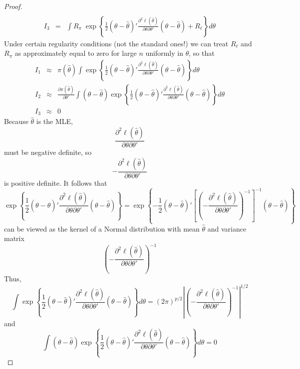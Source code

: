 \documentclass[12pt]{article}
\theoremstyle{definition}
\begin{document}
\begin{proof}
\begin{eqnarray*}
\\
		I_3 &=& \int R_\pi \; \exp{\left\{ \frac{1}{2} \left( \theta - \hat{\theta}  \right)' \frac{\partial^2 \ell(\hat{\theta})}{\partial \theta \partial \theta'} \left( \theta - \hat{\theta}  \right) + R_\ell\right\}} d\theta
	\end{eqnarray*}
Under certain regularity conditions (not the standard ones!) we can treat $R_\ell$ and $R_\pi$ as approximately equal to zero for large $n$ uniformly in $\theta$, so that
	\begin{eqnarray*}
		I_1 &\approx& \pi(\hat{\theta}) \int  \exp{\left\{ \frac{1}{2} \left( \theta - \hat{\theta}  \right)' \frac{\partial^2 \ell(\hat{\theta})}{\partial \theta \partial \theta'} \left( \theta - \hat{\theta}  \right) \right\}} d\theta\\
		I_2 &\approx& \frac{\partial \pi(\hat{\theta})}{\partial \theta'}   \int  \left(\theta - \hat{\theta}  \right) \exp{\left\{ \frac{1}{2} \left( \theta - \hat{\theta}  \right)' \frac{\partial^2 \ell(\hat{\theta})}{\partial \theta \partial \theta'} \left( \theta - \hat{\theta}  \right) \right\}} d\theta\\
		I_3 &\approx& 0
	\end{eqnarray*}	
Because $\hat{\theta}$ is the MLE, 
	$$\frac{\partial^2 \ell(\hat{\theta})}{\partial \theta \partial \theta'}$$ 
must be negative definite, so 
	$$-\frac{\partial^2 \ell(\hat{\theta})}{\partial \theta \partial \theta'}$$
is positive definite. It follows that 
	$$ \exp{\left\{ \frac{1}{2} \left( \theta - \hat{\theta}  \right)' \frac{\partial^2 \ell(\hat{\theta})}{\partial \theta \partial \theta'} \left( \theta - \hat{\theta}  \right) \right\}} =  \exp{\left\{ -\frac{1}{2} \left( \theta - \hat{\theta}  \right)'\left[ \left(-\frac{\partial^2 \ell(\hat{\theta})}{\partial \theta \partial \theta'}\right)^{-1} \right]^{-1}\left( \theta - \hat{\theta}  \right) \right\}}$$
can be viewed as the kernel of a Normal distribution with mean $\hat{\theta}$ and variance matrix 
	$$\left(-\frac{\partial^2 \ell(\hat{\theta})}{\partial \theta \partial \theta'}\right)^{-1}$$
Thus,
	$$\int  \exp{\left\{ \frac{1}{2} \left( \theta - \hat{\theta}  \right)' \frac{\partial^2 \ell(\hat{\theta})}{\partial \theta \partial \theta'} \left( \theta - \hat{\theta}  \right) \right\}} d\theta = \left(2\pi\right)^{p/2}\left| \left(-\frac{\partial^2 \ell(\hat{\theta})}{\partial \theta \partial \theta'}\right)^{-1} \right|^{1/2}$$
and
	$$\int \left(\theta - \hat{\theta}  \right)  \exp{\left\{ \frac{1}{2} \left( \theta - \hat{\theta}  \right)' \frac{\partial^2 \ell(\hat{\theta})}{\partial \theta \partial \theta'} \left( \theta - \hat{\theta}  \right) \right\}} d\theta = 0$$

\end{proof}
\end{document}
